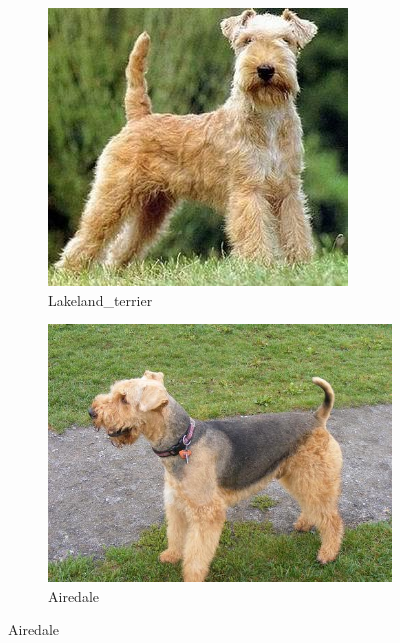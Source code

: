 \documentclass[a4paper,12pt]{article}
\begin{document}
\begin{figure}[ht!]
    \centering
    \begin{subfigure}{0.35\linewidth}
        \centering
        \includegraphics[width=1\linewidth]{Figures/lakeland.jpg}
        \caption{Lakeland\_terrier}
    \end{subfigure}
    \begin{subfigure}{0.35\linewidth}
        \centering
        \includegraphics[width=1\linewidth]{Figures/airedale.jpg}
        \caption{Airedale}
    \end{subfigure}


\end{figure}
\end{document}
